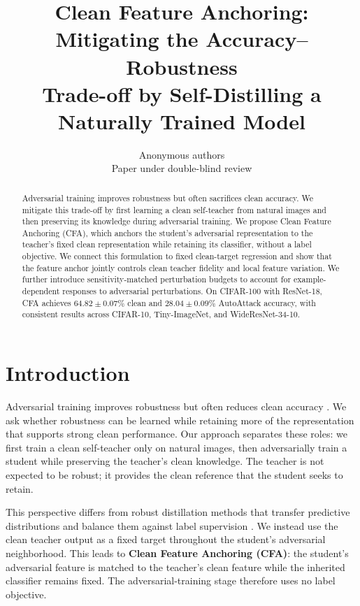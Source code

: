 \documentclass{article} %
\title{Clean Feature Anchoring: Mitigating the Accuracy--Robustness\\
Trade-off by Self-Distilling a Naturally Trained Model}
\author{
Anonymous authors\\
Paper under double-blind review
}
\theoremstyle{plain}
\begin{document}
\maketitle

\begin{abstract}
Adversarial training improves robustness but often sacrifices clean accuracy.
We mitigate this trade-off by first learning a clean self-teacher from natural
images and then preserving its knowledge during adversarial training.
We propose Clean Feature Anchoring (CFA), which anchors the student's
adversarial representation to the teacher's fixed clean representation while
retaining its classifier, without a label objective.
We connect this formulation to fixed clean-target regression and show that the
feature anchor jointly controls clean teacher fidelity and local feature
variation. We further introduce sensitivity-matched perturbation budgets to
account for example-dependent responses to adversarial perturbations.
On CIFAR-100 with ResNet-18, CFA achieves
\(64.82\mathbin{\pm}0.07\%\) clean and
\(28.04\mathbin{\pm}0.09\%\) AutoAttack accuracy, with consistent results
across CIFAR-10, Tiny-ImageNet, and WideResNet-34-10.
\end{abstract}

\section{Introduction}
\label{sec:intro}

Adversarial training improves robustness but often reduces clean accuracy
\citep{PGD,tsipras2018robustness,TRADES}. We ask whether robustness can be
learned while retaining more of the representation that supports strong clean
performance. Our approach separates these roles: we first train a clean
self-teacher only on natural images, then adversarially train a student while
preserving the teacher's clean knowledge. The teacher is not expected to be
robust; it provides the clean reference that the student seeks to retain.

This perspective differs from robust distillation methods that transfer
predictive distributions and balance them against label supervision
\citep{ard,rslad,adr,bmtard}. We instead use the clean teacher output as a
fixed target throughout the student's adversarial neighborhood. This leads to
\textbf{Clean Feature Anchoring (CFA)}: the student's adversarial feature is
matched to the teacher's clean feature while the inherited classifier remains
fixed. The adversarial-training stage therefore uses no label objective.
\end{document}
